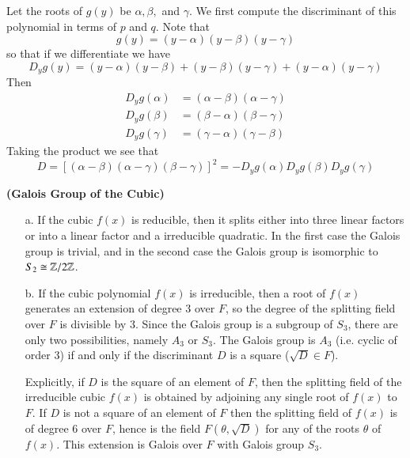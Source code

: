 \documentclass[12pt, a4paper, oneside, openright, titlepage]{book}
\begin{document}
Let the roots of $g(y)$ be $\alpha, \beta,$ and $\gamma$. We first compute the discriminant of this polynomial in terms of $p$ and $q$. Note that \begin{equation*}
    g(y) = (y-\alpha)(y-\beta)(y-\gamma)
\end{equation*}
so that if we differentiate we have \begin{equation*}
    D_yg(y) = (y-\alpha)(y-\beta) + (y-\beta)(y-\gamma) + (y-\alpha)(y-\gamma)
\end{equation*}
Then \begin{align*}
    D_yg(\alpha) &= (\alpha-\beta)(\alpha-\gamma) \\
    D_yg(\beta) &= (\beta-\alpha)(\beta -\gamma) \\
    D_yg(\gamma) &= (\gamma - \alpha)(\gamma - \beta)
\end{align*}
Taking the product we see that \begin{equation*}
    D = [(\alpha-\beta)(\alpha-\gamma)(\beta-\gamma)]^2 = -D_yg(\alpha)D_yg(\beta)D_yg(\gamma)
\end{equation*}


\textbf{(Galois Group of the Cubic)}

\begin{enumerate}
    \item[a.] If the cubic $f(x)$ is reducible, then it splits either into three linear factors or into a linear factor and a irreducible quadratic. In the first case the Galois group is trivial, and in the second case the Galois group is isomorphic to $S_2 \cong \mathbb Z/2\mathbb Z$.
    \item[b.] If the cubic polynomial $f(x)$ is irreducible, then a root of $f(x)$ generates an extension of degree $3$ over $F$, so the degree of the splitting field over $F$ is divisible by $3$. Since the Galois group is a subgroup of $S_3$, there are only two possibilities, namely $A_3$ or $S_3$. The Galois group is $A_3$ (i.e. cyclic of order $3$) if and only if the discriminant $D$ is a square ($\sqrt{D} \in F$).

        Explicitly, if $D$ is the square of an element of $F$, then the splitting field of the irreducible cubic $f(x)$ is obtained by adjoining any single root of $f(x)$ to $F$. If $D$ is not a square of an element of $F$ then the splitting field of $f(x)$ is of degree $6$ over $F$, hence is the field $F(\theta,\sqrt{D})$ for any of the roots $\theta$ of $f(x)$. This extension is Galois over $F$ with Galois group $S_3$.
\end{enumerate}
\end{document}
